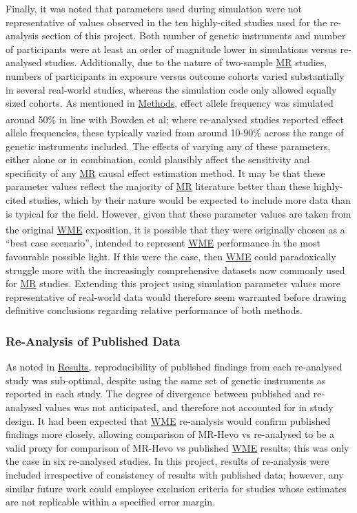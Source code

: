 \documentclass[
]{article}
\begin{document}
Finally, it was noted that parameters used during simulation were not representative of values observed in the ten highly-cited studies used for the re-analysis section of this project. Both number of genetic instruments and number of participants were at least an order of magnitude lower in simulations versus re-analysed studies. Additionally, due to the nature of two-sample \hyperref[acronyms_MR]{MR} studies, numbers of participants in exposure versus outcome cohorts varied substantially in several real-world studies, whereas the simulation code only allowed equally sized cohorts. As mentioned in \hyperref[methods]{Methods}, effect allele frequency was simulated around 50\% in line with Bowden et al\textsuperscript{}; where re-analysed studies reported effect allele frequencies, these typically varied from around 10-90\% across the range of genetic instruments included. The effects of varying any of these parameters, either alone or in combination, could plausibly affect the sensitivity and specificity of any \hyperref[acronyms_MR]{MR} causal effect estimation method. It may be that these parameter values reflect the majority of \hyperref[acronyms_MR]{MR} literature better than these highly-cited studies, which by their nature would be expected to include more data than is typical for the field. However, given that these parameter values are taken from the original \hyperref[acronyms_WME]{WME} exposition\textsuperscript{}, it is possible that they were originally chosen as a ``best case scenario'', intended to represent \hyperref[acronyms_WME]{WME} performance in the most favourable possible light. If this were the case, then \hyperref[acronyms_WME]{WME} could paradoxically struggle more with the increasingly comprehensive datasets now commonly used for \hyperref[acronyms_MR]{MR} studies. Extending this project using simulation parameter values more representative of real-world data would therefore seem warranted before drawing definitive conclusions regarding relative performance of both methods.

\subsubsection{Re-Analysis of Published Data}\label{lim-cite}

As noted in \hyperref[results]{Results}, reproducibility of published findings from each re-analysed study was sub-optimal, despite using the same set of genetic instruments as reported in each study. The degree of divergence between published and re-analysed values was not anticipated, and therefore not accounted for in study design. It had been expected that \hyperref[acronyms_WME]{WME} re-analysis would confirm published findings more closely, allowing comparison of MR-Hevo vs re-analysed to be a valid proxy for comparison of MR-Hevo vs published \hyperref[acronyms_WME]{WME} results; this was only the case in six re-analysed studies. In this project, results of re-analysis were included irrespective of consistency of results with published data; however, any similar future work could employee exclusion criteria for studies whose estimates are not replicable within a specified error margin.
\end{document}
